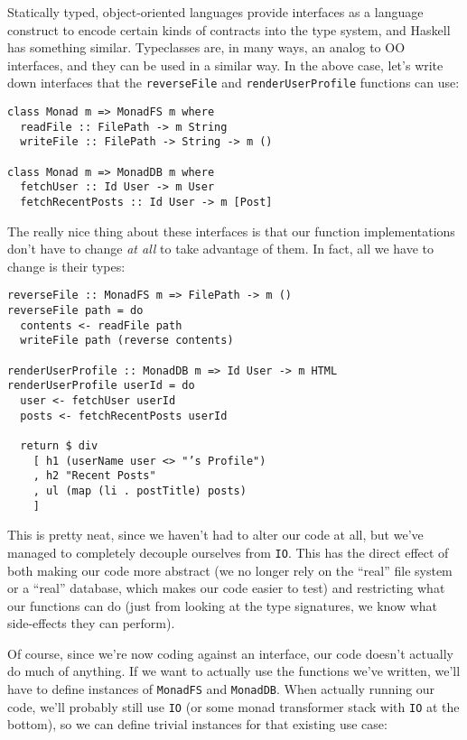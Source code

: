 Statically typed, object-oriented languages provide interfaces as a
language construct to encode certain kinds of contracts into the type
system, and Haskell has something similar. Typeclasses are, in many
ways, an analog to OO interfaces, and they can be used in a similar way.
In the above case, let's write down interfaces that the
\texttt{reverseFile} and \texttt{renderUserProfile} functions can use:

\begin{verbatim}
class Monad m => MonadFS m where
  readFile :: FilePath -> m String
  writeFile :: FilePath -> String -> m ()

class Monad m => MonadDB m where
  fetchUser :: Id User -> m User
  fetchRecentPosts :: Id User -> m [Post]
\end{verbatim}
The really nice thing about these interfaces is that our function
implementations don't have to change \emph{at all} to take advantage of
them. In fact, all we have to change is their types:

\begin{verbatim}
reverseFile :: MonadFS m => FilePath -> m ()
reverseFile path = do
  contents <- readFile path
  writeFile path (reverse contents)

renderUserProfile :: MonadDB m => Id User -> m HTML
renderUserProfile userId = do
  user <- fetchUser userId
  posts <- fetchRecentPosts userId

  return $ div
    [ h1 (userName user <> "’s Profile")
    , h2 "Recent Posts"
    , ul (map (li . postTitle) posts)
    ]
\end{verbatim}
This is pretty neat, since we haven't had to alter our code at all, but
we've managed to completely decouple ourselves from \texttt{IO}. This
has the direct effect of both making our code more abstract (we no
longer rely on the ``real'' file system or a ``real'' database, which
makes our code easier to test) and restricting what our functions can do
(just from looking at the type signatures, we know what side-effects
they can perform).

Of course, since we're now coding against an interface, our code doesn't
actually do much of anything. If we want to actually use the functions
we've written, we'll have to define instances of \texttt{MonadFS} and
\texttt{MonadDB}. When actually running our code, we'll probably still
use \texttt{IO} (or some monad transformer stack with \texttt{IO} at the
bottom), so we can define trivial instances for that existing use case:

